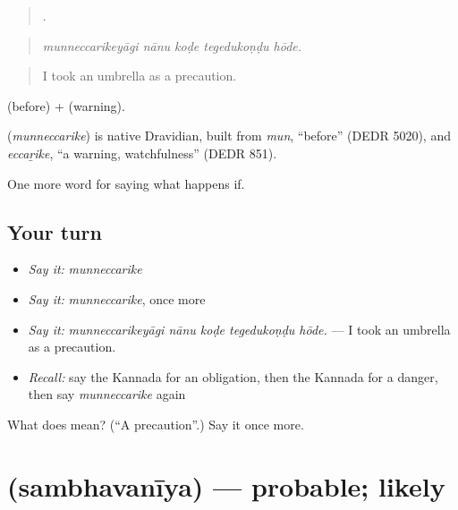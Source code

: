 \begin{quote}
    .
\end{quote}

\begin{quote}
\emph{munneccarikeyāgi nānu koḍe tegedukoṇḍu hōde.}
\end{quote}

\begin{quote}
I took an umbrella as a precaution.
\end{quote}

 (before) +  (warning).

\begin{cousinweb}
\textbf{} (\emph{munneccarike}) is native Dravidian, built from \emph{mun}, \textquotedblleft{}before\textquotedblright{} (DEDR 5020), and \emph{eccaṟike}, \textquotedblleft{}a warning, watchfulness\textquotedblright{} (DEDR 851).
\end{cousinweb}

\begin{grammarlens}[title={What you've built}]
One more word for saying what happens if.
\end{grammarlens}

\subsection*{Your turn}
\begin{itemize}
\raggedright
  \item \emph{Say it:} \emph{munneccarike}
  \item \emph{Say it:} \emph{munneccarike}, once more
  \item \emph{Say it:} \emph{munneccarikeyāgi nānu koḍe tegedukoṇḍu hōde.} — I took an umbrella as a precaution.
  \item \emph{Recall:} say the Kannada for an obligation, then the Kannada for a danger, then say \emph{munneccarike} again
\end{itemize}

\begin{tcolorbox}[breakable,colback=teal!4,colframe=teal!35!black,title={Before you move on}]
What does  mean? (\textquotedblleft{}A precaution\textquotedblright{}.) Say it once more.
\end{tcolorbox}
\section[\texorpdfstring{\kn{ಸಂಭವನೀಯ} (sambhavanīya)}{ಸಂಭವನೀಯ (sambhavanīya)}]{ (sambhavanīya) — probable; likely}

